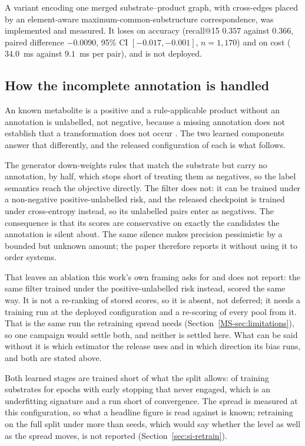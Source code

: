 \documentclass[journal=jcisd8,manuscript=suppinfo,layout=onecolumn]{achemso}
\begin{document}
A variant encoding one merged substrate--product graph, with cross-edges placed by an
element-aware maximum-common-substructure correspondence, was implemented and measured. It loses
on accuracy (recall@15 $0.357$ against $0.366$, paired difference $-0.0090$, 95\% CI
$[-0.017, -0.001]$, $n = 1{,}170$) and on cost ($34.0$~ms against $9.1$~ms per pair), and is not
deployed.

\subsection{How the incomplete annotation is handled}

An known metabolite is a positive and a rule-applicable product without an annotation is
unlabelled, not negative, because a missing annotation does not establish that a transformation
does not occur \citep{Jain_2016}. The two learned components answer that differently, and the
released configuration of each is what follows.

The generator down-weights rules that match the substrate but carry no annotation, by half, which
stops short of treating them as negatives, so the label semantics reach the objective directly. The
filter
does not: it can be trained under a non-negative positive-unlabelled risk, and the released
checkpoint is trained under cross-entropy instead, so its unlabelled pairs enter as negatives. The
consequence is that its scores are conservative on exactly the candidates the annotation is silent
about. The same silence makes precision pessimistic by a bounded but unknown amount; the paper
therefore reports it without using it to order systems.

That leaves an ablation this work's own framing asks for and does not report: the same filter
trained under the positive-unlabelled risk instead, scored the same way. It is not a re-ranking
of stored scores, so it is absent, not deferred; it needs a training run at the
deployed configuration and a re-scoring of every pool from it. That is the same run the
retraining spread needs (Section~\ref{MS-sec:limitations}), so one campaign would settle both,
and neither is settled here. What can be said without it is which estimator the release uses and
in which direction its bias runs, and both are stated above.


Both learned stages are trained short of what the split allows: \numTrainSubstrates{} of
\numSplitTrainSubstrates{} training substrates for \numTrainEpochsWord{} epochs with early stopping
that never engaged, which is an underfitting signature and a run short of convergence. The spread
is measured at this configuration, so what a headline figure is read against is known; retraining
on the full split under more than \numSpreadSeedsWord{} seeds, which would say whether the level as
well as the spread moves, is not reported (Section~\ref{sec:si-retrain}).
\end{document}
